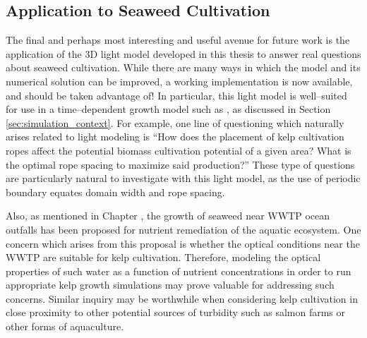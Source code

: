 \subsection{Application to Seaweed Cultivation}
The final and perhaps most interesting and useful avenue for future work is the application of the 3D light model developed in this thesis to answer real questions about seaweed cultivation.
While there are many ways in which the model and its numerical solution can be improved, a working implementation is now available, and should be taken advantage of!
In particular, this light model is well--suited for use in a time--dependent growth model such as \cite{broch_modelling_2012}, as discussed in Section \ref{sec:simulation_context}.
For example, one line of questioning which naturally arises related to light modeling is ``How does the placement of kelp cultivation ropes affect the potential biomass cultivation potential of a given area?
What is the optimal rope spacing to maximize said production?''
These type of questions are particularly natural to investigate with this light model, as the use of periodic boundary equates domain width and rope spacing.

Also, as mentioned in Chapter \Rom{\ref{chap:introduction}}, the growth of seaweed near WWTP ocean outfalls has been proposed for nutrient remediation of the aquatic ecosystem.
One concern which arises from this proposal is whether the optical conditions near the WWTP are suitable for kelp cultivation.
Therefore, modeling the optical properties of such water as a function of nutrient concentrations in order to run appropriate kelp growth simulations may prove valuable for addressing such concerns.
Similar inquiry may be worthwhile when considering kelp cultivation in close proximity to other potential sources of turbidity such as salmon farms \cite{broch_modelling_2013} or other forms of aquaculture.
